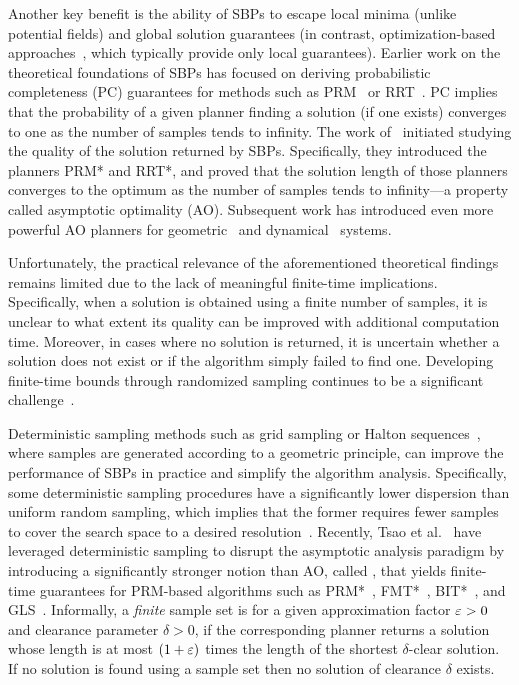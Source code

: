 Another key benefit is the ability of SBPs to escape local minima (unlike potential fields) and global solution guarantees (in contrast, optimization-based approaches~\cite{SchulmanDHLABPPGA14}, which typically provide only local guarantees). Earlier work on the theoretical foundations of SBPs has focused on deriving probabilistic completeness (PC) guarantees for methods such as PRM~\cite{kavraki1996probabilistic} or RRT~\cite{LaVKuf01,KunzS14,Kleinbort.Solovey.ea.19}. PC implies that the probability of a given planner finding a solution (if one exists) converges to one as the number of samples tends to infinity. The work of~\citet{karaman2011sampling} initiated studying the quality of the solution returned by SBPs. Specifically, they introduced the planners PRM* and RRT*, and proved that the solution length of those planners converges to the optimum as the number of samples tends to infinity---a property called asymptotic optimality (AO). Subsequent work has introduced even more powerful AO planners for geometric~\cite{JSCP15,GammellBS20} and dynamical~\cite{HauserZ16,LiETAL16} systems.

Unfortunately, the practical relevance of the aforementioned theoretical findings remains limited due to the lack of meaningful finite-time implications. Specifically, when a solution is obtained using a finite number of samples, it is unclear to what extent its quality can be improved with additional computation time. Moreover, in cases where no solution is returned, it is uncertain whether a solution does not exist or if the algorithm simply failed to find one. Developing finite-time bounds through randomized sampling continues to be a significant challenge~\cite{DobsonMB15,shaw2024towards}.

Deterministic sampling methods such as grid sampling or Halton sequences~\cite{lavalle2006planning}, where samples are generated according to a geometric principle, can improve the performance of SBPs in practice and simplify the algorithm analysis. Specifically, some deterministic sampling procedures have a significantly lower dispersion than uniform random sampling, which implies that the former requires fewer samples to cover the search space to a desired resolution~\cite{janson2018deterministic}. 
Recently, Tsao et al.~\cite{tsao2020sample} have leveraged deterministic sampling to disrupt the asymptotic analysis paradigm by introducing a significantly stronger notion than AO, called \decomps, that yields finite-time guarantees for PRM-based algorithms such as PRM*~\cite{karaman2011sampling}, FMT*~\cite{JSCP15}, BIT*~\cite{GammellBS20}, and GLS~\cite{MandalikaCSS19}. Informally, a \emph{finite} sample set is \decomp for a given approximation factor $\varepsilon>0$ and clearance parameter $\delta>0$, if the corresponding planner returns a solution whose length is at most $(1+\varepsilon)$ times the length of the shortest $\delta$-clear solution. If no solution is found using a \decomp sample set then no solution of clearance $\delta$ exists. 

